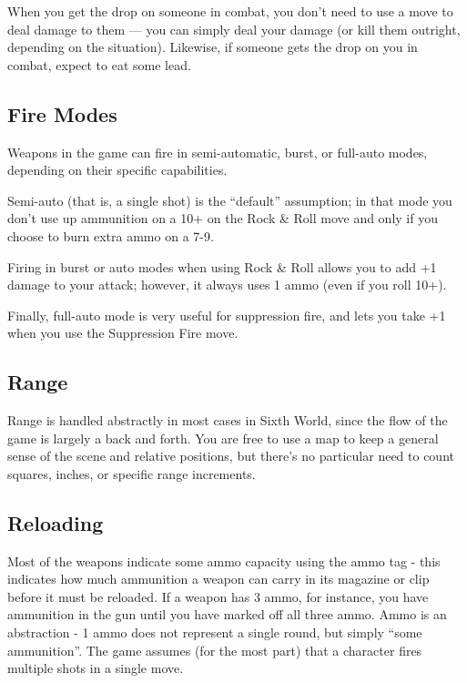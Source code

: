 When you get the drop on someone in combat, you don’t need to use a move to deal damage to them — you can simply deal your damage (or kill them outright, depending on the situation). Likewise, if someone gets the drop on you in combat, expect to eat some lead.


\subsection*{Fire Modes}
Weapons in the game can fire in semi-automatic, burst, or full-auto modes, depending on their specific capabilities.

Semi-auto (that is, a single shot) is the ``default'' assumption; in that mode you don't use up ammunition on a 10+ on the Rock \& Roll move and only if you choose to burn extra ammo on a 7-9.

Firing in burst or auto modes when using Rock \& Roll allows you to add +1 damage to your attack; however, it always uses 1 ammo (even if you roll 10+).

Finally, full-auto mode is very useful for suppression fire, and lets you take +1 when you use the Suppression Fire move.



\subsection*{Range}
Range is handled abstractly in most cases in Sixth World, since the flow of the game is largely a back and forth. You are free to use a map to keep a general sense of the scene and relative positions, but there’s no particular need to count squares, inches, or specific range increments.


\subsection*{Reloading}
Most of the weapons indicate some ammo capacity using the ammo tag - this indicates how much ammunition a weapon can carry in its magazine or clip before it must be reloaded. If a weapon has 3 ammo, for instance, you have ammunition in the gun until you have marked off all three ammo. Ammo is an abstraction - 1 ammo does not represent a single round, but simply ``some ammunition''. The game assumes (for the most part) that a character fires multiple shots in a single move.

